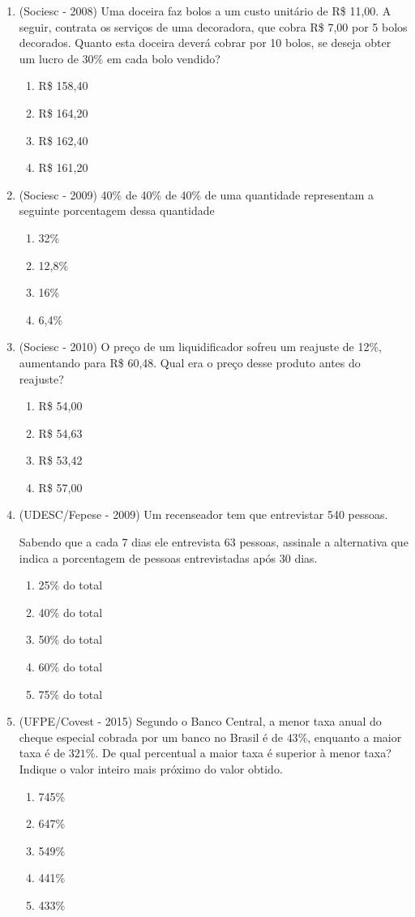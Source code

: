 \begin{enumerate}
 \item (Sociesc - 2008) Uma doceira faz bolos a um custo unitário de R\$ 11,00. A seguir, contrata os serviços de uma decoradora, que cobra R\$ 7,00 por 5 bolos decorados. Quanto esta doceira deverá cobrar por 10 bolos, se deseja obter um lucro de 30\% em cada bolo vendido?
  \begin{enumerate}
  \item R\$ 158,40
  \item R\$ 164,20
  \item R\$ 162,40
  \item R\$ 161,20
 \end{enumerate}

 \item (Sociesc - 2009) 40\% de 40\% de 40\% de uma quantidade representam a seguinte porcentagem dessa quantidade
  \begin{enumerate}
  \item 32\%
  \item 12,8\%
  \item 16\%
  \item 6,4\%
 \end{enumerate}

 \item (Sociesc - 2010) O preço de um liquidificador sofreu um reajuste de 12\%, aumentando para R\$ 60,48. Qual era o preço desse produto antes do reajuste?
  \begin{enumerate}
  \item R\$ 54,00
  \item R\$ 54,63
  \item R\$ 53,42
  \item R\$ 57,00
 \end{enumerate}

 \item (UDESC/Fepese - 2009) Um recenseador tem que entrevistar 540 pessoas.

 Sabendo que a cada 7 dias ele entrevista 63 pessoas, assinale a alternativa que indica a porcentagem de pessoas entrevistadas após 30 dias.
  \begin{enumerate}
  \item 25\% do total
  \item 40\% do total
  \item 50\% do total
  \item 60\% do total
  \item 75\% do total
 \end{enumerate}

 \item (UFPE/Covest - 2015) Segundo o Banco Central, a menor taxa anual do cheque especial cobrada por um banco no Brasil é de $43\%$, enquanto a maior taxa é de $321\%$. De qual percentual a maior taxa é superior à menor taxa? Indique o valor inteiro mais próximo do valor obtido.
 \begin{enumerate}
 \item 745\%
 \item 647\%
 \item 549\%
 \item 441\%
 \item 433\%
 \end{enumerate}


\end{enumerate}
